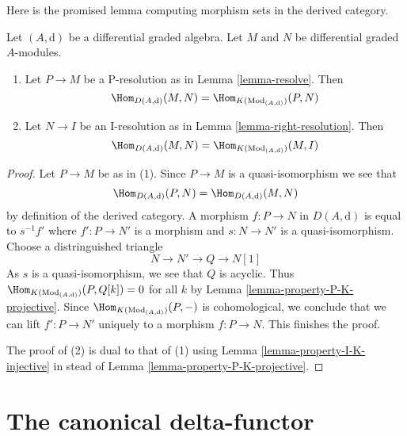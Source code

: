 \noindent
Here is the promised lemma computing morphism sets in the
derived category.

\begin{lemma}
\label{lemma-hom-derived}
Let $(A, \text{d})$ be a differential graded algebra.
Let $M$ and $N$ be differential graded $A$-modules.
\begin{enumerate}
\item Let $P \to M$ be a P-resolution as in
Lemma \ref{lemma-resolve}. Then
$$
\Hom_{D(A, \text{d})}(M, N) =
\Hom_{K(\text{Mod}_{(A, \text{d})})}(P, N)
$$
\item Let $N \to I$ be an I-resolution as in
Lemma \ref{lemma-right-resolution}. Then
$$
\Hom_{D(A, \text{d})}(M, N) =
\Hom_{K(\text{Mod}_{(A, \text{d})})}(M, I)
$$
\end{enumerate}
\end{lemma}

\begin{proof}
Let $P \to M$ be as in (1). Since $P \to M$ is a quasi-isomorphism we see that
$$
\Hom_{D(A, \text{d})}(P, N) = \Hom_{D(A, \text{d})}(M, N)
$$
by definition of the derived category. A morphism
$f : P \to N$ in $D(A, \text{d})$ is equal to
$s^{-1}f'$ where $f' : P \to N'$ is a morphism and
$s : N \to N'$ is a quasi-isomorphism. Choose a distringuished triangle
$$
N \to N' \to Q \to N[1]
$$
As $s$ is a quasi-isomorphism, we see that $Q$ is acyclic. Thus
$\Hom_{K(\text{Mod}_{(A, \text{d})})}(P, Q[k]) = 0$ for all $k$ by
Lemma \ref{lemma-property-P-K-projective}. Since
$\Hom_{K(\text{Mod}_{(A, \text{d})})}(P, -)$
is cohomological, we conclude that we can lift $f' : P \to N'$
uniquely to a morphism $f : P \to N$. This finishes the proof.

\medskip\noindent
The proof of (2) is dual to that of (1) using
Lemma \ref{lemma-property-I-K-injective} in stead of
Lemma \ref{lemma-property-P-K-projective}.
\end{proof}








\section{The canonical delta-functor}
\label{section-canonical-delta-functor}

